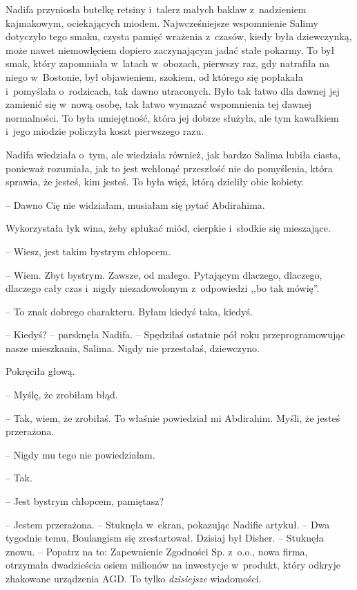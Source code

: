 \documentclass[oneside,polish,11pt,sfheadings]{mwbk}
\let\footnote=\endnote
\begin{document}
Nadifa przyniosła butelkę retsiny i~talerz małych baklaw z~nadzieniem
kajmakowym, ociekających miodem. Najwcześniejsze wspomnienie Salimy
dotyczyło tego smaku, czysta pamięć wrażenia z~czasów, kiedy była
dziewczynką, może nawet niemowlęciem dopiero zaczynającym jadać stałe
pokarmy. To był smak, który zapomniała w~latach w~obozach, pierwszy raz,
gdy natrafiła na niego w~Bostonie, był objawieniem, szokiem, od którego
się popłakała i~pomyślała o~rodzicach, tak dawno utraconych. Było tak
łatwo dla dawnej jej zamienić się w~nową osobę, tak łatwo wymazać
wspomnienia tej dawnej normalności. To była umiejętność, która jej
dobrze służyła, ale tym kawałkiem i~jego miodzie policzyła koszt
pierwszego razu.

Nadifa wiedziała o~tym, ale wiedziała również, jak bardzo Salima lubiła
ciasta, ponieważ rozumiała, jak to jest wchłonąć przeszłość nie do
pomyślenia, która sprawia, że jesteś, kim jesteś. To była więź, którą
dzieliły obie kobiety.

-- Dawno Cię nie widziałam, musiałam się pytać Abdirahima.

Wykorzystała łyk wina, żeby spłukać miód, cierpkie i~słodkie się
mieszające. 

-- Wiesz, jest takim bystrym chłopcem.

-- Wiem. Zbyt bystrym. Zawsze, od małego. Pytającym dlaczego, dlaczego,
dlaczego cały czas i~nigdy niezadowolonym z~odpowiedzi ,,bo tak mówię''.

-- To znak dobrego charakteru. Byłam kiedyś taka, kiedyś.

-- Kiedyś? -- parsknęła Nadifa. -- Spędziłaś ostatnie pół roku
przeprogramowując nasze mieszkania, Salima. Nigdy nie przestałaś,
dziewczyno.

Pokręciła głową. 

-- Myślę, że zrobiłam błąd.

-- Tak, wiem, że zrobiłaś. To właśnie powiedział mi Abdirahim. Myśli, że
jesteś przerażona.

-- Nigdy mu tego nie powiedziałam.

-- Tak. 

-- Jest bystrym chłopcem, pamiętasz?

-- Jestem przerażona. -- Stuknęła w~ekran, pokazując Nadifie artykuł. -- Dwa tygodnie temu, Boulangism się zrestartował. Dzisiaj był Disher. -- Stuknęła znowu. -- Popatrz na to: Zapewnienie Zgodności\footnote{ oryg.
compliance assurance -- przyp.tłum.} Sp. z~o.o., nowa firma, otrzymała dwadzieścia osiem
milionów na inwestycje w~produkt, który odkryje zhakowane urządzenia
AGD. To tylko \textit{dzisiejsze} wiadomości.
\end{document}
